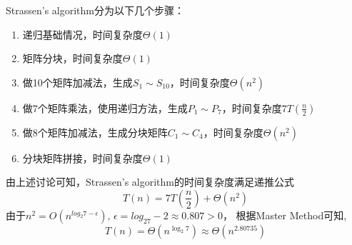 \documentclass{article}
\begin{document}
Strassen's algorithm分为以下几个步骤：
\begin{enumerate}
	\item 递归基础情况，时间复杂度$\Theta(1)$
		 
	
	\item 矩阵分块，时间复杂度$\Theta(1)$
		
	
	\item 做10个矩阵加减法，生成$S_1\sim S_{10}$，时间复杂度$\Theta(n^2)$
		
	
	\item 做7个矩阵乘法，使用递归方法，生成$P_1\sim P_7$，时间复杂度\textbf{$7T(\frac{n}{2})$}
		

	\item 做8个矩阵加减法，生成分块矩阵$C_1\sim C_4$，时间复杂度$\Theta(n^2)$
		

	\item 分块矩阵拼接，时间复杂度$\Theta(1)$
		
\end{enumerate}
	\par 由上述讨论可知，Strassen's algorithm的时间复杂度满足递推公式
	\[ T(n) = 7T(\frac{n}{2}) + \Theta(n^2) \]
	由于$n^2 = O(n^{log_2 7 - \epsilon}),\, \epsilon = log_27 - 2 \approx 0.807 > 0$，
	根据Master Method可知,
	\[T(n) = \Theta(n^{\log_2 7}) \approx \Theta(n^{2.80735})\]
\end{document}

